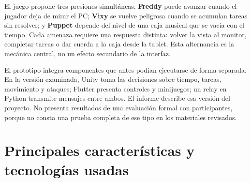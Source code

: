 \documentclass[11pt,a4paper]{article}
\newcommand{\dato}[1]{\textcolor{Azul}{\bfseries #1}}
\begin{document}
El juego propone tres presiones simultáneas. \dato{Freddy} puede avanzar cuando el jugador deja de mirar el PC; \dato{Vixy} se vuelve peligrosa cuando se acumulan tareas sin resolver; y \dato{Puppet} depende del nivel de una caja musical que se vacía con el tiempo. Cada amenaza requiere una respuesta distinta: volver la vista al monitor, completar tareas o dar cuerda a la caja desde la tablet. Esta alternancia es la mecánica central, no un efecto secundario de la interfaz.

El prototipo integra componentes que antes podían ejecutarse de forma separada. En la versión examinada, Unity toma las decisiones sobre tiempo, tareas, movimiento y ataques; Flutter presenta controles y minijuegos; un relay en Python transmite mensajes entre ambos. El informe describe esa versión del proyecto. No presenta resultados de una evaluación formal con participantes, porque no consta una prueba completa de ese tipo en los materiales revisados.

\section{Principales características y tecnologías usadas}
\end{document}
